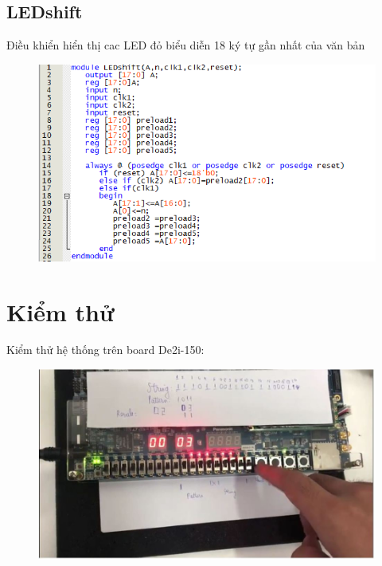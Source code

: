 \documentclass[a4paper]{article}
\begin{document}
	\subsection{LEDshift}
	Điều khiển hiển thị cac LED đỏ biểu diễn 18 ký tự gần nhất của văn bản
	
	\begin{center}
	\begin{figure}[H]
		\begin{center}
			\includegraphics[scale=.83] {l.png}
		\end{center}
	\end{figure}
	\end{center}  
	
\section{Kiểm thử}
Kiểm thử hệ thống trên board De2i-150:
	\begin{center}
	\begin{figure}[H]
		\begin{center}
			\includegraphics[scale=.5] {k2.jpg}
		\end{center}
	\end{figure}
	\end{center}  
	
\end{document}

